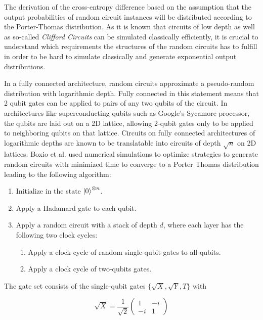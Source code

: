 The derivation of the cross-entropy difference based on the assumption that the
output probabilities of random circuit instances will be distributed according to
the Porter-Thomas distribution. As it is known that circuits of low depth as
well as so-called \textit{Clifford Circuits} can be simulated classically
efficiently, it is crucial to understand which requirements the structures of
the random circuits has to fulfill in order to be hard to simulate classically and generate
exponential output distributions.

In a fully connected architecture, random circuits approximate a pseudo-random
distribution with logarithmic depth. Fully connected in this statement means
that 2 qubit gates can be applied to pairs of any two qubits of the circuit. In
architectures like superconducting qubits such as Google's Sycamore
processor, the qubits are laid out on a 2D lattice, allowing 2-qubit gates only
to be applied to neighboring qubits on that lattice. Circuits on fully
connected architectures of logarithmic depths are known to be translatable into
circuits of depth $\sqrt{n}$ on 2D lattices. Boxio et al. used numerical
simulations to optimize strategies to generate random circuits with minimized
time to converge to a Porter Thomas distribution leading to the following algorithm:

\begin{enumerate}
  \item Initialize in the state $\Ket{0}^{\otimes n}$.
  \item Apply a Hadamard gate to each qubit.
  \item Apply a random circuit with a stack of depth $d$, where each layer has
    the following two clock cycles:
    \begin{enumerate}
      \item Apply a clock cycle of random single-qubit gates to all qubits.
        \item Apply a clock cycle of two-qubits gates.
    \end{enumerate}
\end{enumerate}

The gate set consists of the single-qubit gates $\{\sqrt{X}, \sqrt{Y}, T\}$ with

\begin{equation}
  \sqrt{X} = \frac{1}{\sqrt{2}} \begin{pmatrix}
    1 & - i \\
    - i & 1
    \end{pmatrix}
\end{equation}

